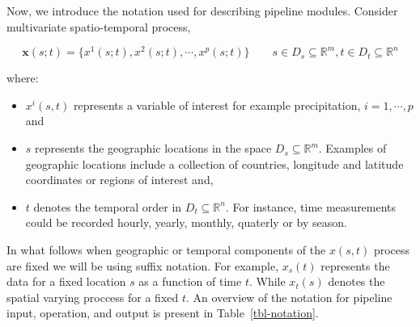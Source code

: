\documentclass[
]{interact}
\begin{document}
Now, we introduce the notation used for describing pipeline modules.
Consider multivariate spatio-temporal process,

\begin{equation}
\mathbf{x}(s;t) = \{x^1(s;t), x^2(s;t), \cdots, x^p(s;t)\} \qquad s \in D_s \subseteq \mathbb{R}^m, t \in D_t \subseteq \mathbb{R}^n 
\end{equation}

where:

\begin{itemize}
\item
  \(x^i(s, t)\) represents a variable of interest for example
  precipitation, \(i = 1, \cdots, p\) and
\item
  \(s\) represents the geographic locations in the space
  \(D_s \subseteq \mathbb{R}^m\). Examples of geographic locations
  include a collection of countries, longitude and latitude coordinates
  or regions of interest and,
\item
  \(t\) denotes the temporal order in \(D_t \subseteq \mathbb{R}^n\).
  For instance, time measurements could be recorded hourly, yearly,
  monthly, quaterly or by season.
\end{itemize}

In what follows when geographic or temporal components of the \(x(s,t)\)
process are fixed we will be using suffix notation. For example,
\(x_{s}(t)\) represents the data for a fixed location \(s\) as a
function of time \(t\). While \(x_{t}(s)\) denotes the spatial varying
proccess for a fixed \(t\). An overview of the notation for pipeline
input, operation, and output is present in Table~\ref{tbl-notation}.
\end{document}
